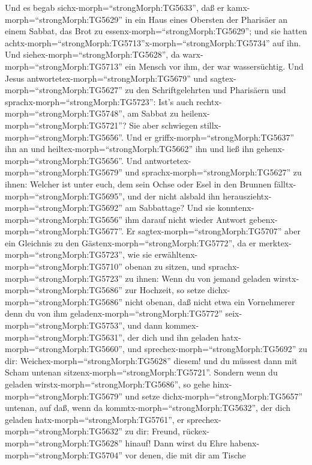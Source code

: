 Und es begab sichx-morph=``strongMorph:TG5633'', daß er
kamx-morph=``strongMorph:TG5629'' in ein Haus eines Obersten der
Pharisäer an einem Sabbat, das Brot zu
essenx-morph=``strongMorph:TG5629''; und sie hatten
achtx-morph=``strongMorph:TG5713''x-morph=``strongMorph:TG5734'' auf
ihn.  Und siehex-morph=``strongMorph:TG5628'', da
warx-morph=``strongMorph:TG5713'' ein Mensch vor ihm, der war
wassersüchtig.  Und Jesus
antwortetex-morph=``strongMorph:TG5679'' und
sagtex-morph=``strongMorph:TG5627'' zu den Schriftgelehrten und
Pharisäern und sprachx-morph=``strongMorph:TG5723'': Ist's auch
rechtx-morph=``strongMorph:TG5748'', am Sabbat zu
heilenx-morph=``strongMorph:TG5721''?  Sie aber schwiegen
stillx-morph=``strongMorph:TG5656''. Und er
griffx-morph=``strongMorph:TG5637'' ihn an und
heiltex-morph=``strongMorph:TG5662'' ihn und ließ ihn
gehenx-morph=``strongMorph:TG5656''.  Und
antwortetex-morph=``strongMorph:TG5679'' und
sprachx-morph=``strongMorph:TG5627'' zu ihnen: Welcher ist unter euch,
dem sein Ochse oder Esel in den Brunnen
fälltx-morph=``strongMorph:TG5695'', und der nicht alsbald ihn
herausziehtx-morph=``strongMorph:TG5692'' am Sabbattage? 
Und sie konntenx-morph=``strongMorph:TG5656'' ihm darauf nicht wieder
Antwort gebenx-morph=``strongMorph:TG5677''.  Er
sagtex-morph=``strongMorph:TG5707'' aber ein Gleichnis zu den
Gästenx-morph=``strongMorph:TG5772'', da er
merktex-morph=``strongMorph:TG5723'', wie sie
erwähltenx-morph=``strongMorph:TG5710'' obenan zu sitzen, und
sprachx-morph=``strongMorph:TG5723'' zu ihnen:  Wenn du von
jemand geladen wirstx-morph=``strongMorph:TG5686'' zur Hochzeit, so
setze dichx-morph=``strongMorph:TG5686'' nicht obenan, daß nicht etwa
ein Vornehmerer denn du von ihm geladenx-morph=``strongMorph:TG5772''
seix-morph=``strongMorph:TG5753'',  und dann
kommex-morph=``strongMorph:TG5631'', der dich und ihn geladen
hatx-morph=``strongMorph:TG5660'', und
sprechex-morph=``strongMorph:TG5692'' zu dir:
Weichex-morph=``strongMorph:TG5628'' diesem! und du müssest dann mit
Scham untenan sitzenx-morph=``strongMorph:TG5721''. 
Sondern wenn du geladen wirstx-morph=``strongMorph:TG5686'', so gehe
hinx-morph=``strongMorph:TG5679'' und setze
dichx-morph=``strongMorph:TG5657'' untenan, auf daß, wenn da
kommtx-morph=``strongMorph:TG5632'', der dich geladen
hatx-morph=``strongMorph:TG5761'', er
sprechex-morph=``strongMorph:TG5632'' zu dir: Freund,
rückex-morph=``strongMorph:TG5628'' hinauf! Dann wirst du Ehre
habenx-morph=``strongMorph:TG5704'' vor denen, die mit dir am Tische
